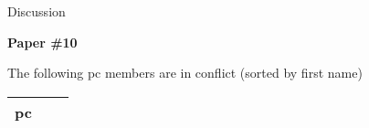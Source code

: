 \begin{frame}{Discussion}
  \begin{center}
    {\LARGE\bfseries Paper \#10}
    
    \bigskip
    
    The following pc members are in conflict (sorted by first name)
    
    \bigskip
    
    \begin{footnotesize}
      \begin{tabularx}{\linewidth}{|X|X|X|} \hline 
        pc #5 &  &  \\ \hline 
      \end{tabularx}
    \end{footnotesize}
  \end{center}
\end{frame}
